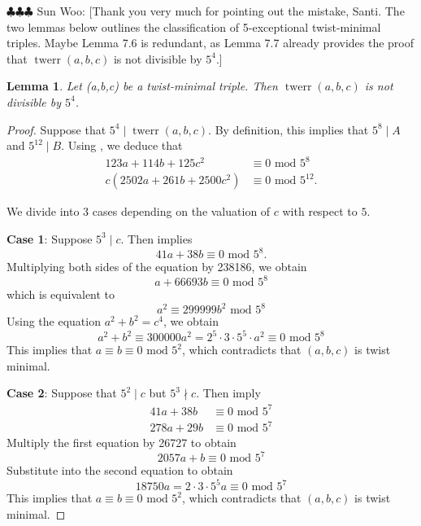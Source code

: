 \documentclass[12pt]{amsart}
\newcounter{counter}[section] %
\numberwithin{equation}{section} %
\newtheorem{lemma}[counter]{Lemma}
\theoremstyle{definition} \newtheorem{definition}[counter]{Definition}
\theoremstyle{remark} \newtheorem{nonexam}[counter]{Non-example}
\newcommand{\spark}[1]{{\color{olive} \sf
    $\clubsuit\clubsuit\clubsuit$ Sun Woo: [#1]}}
\DeclareMathOperator{\twerr}{twerr} %
\begin{document}
\spark{Thank you very much for pointing out the mistake, Santi. The two lemmas below outlines the classification of 5-exceptional twist-minimal triples. Maybe Lemma 7.6 is redundant, as Lemma 7.7 already provides the proof that $\twerr(a,b,c)$ is not divisible by $5^4$.}

\begin{lemma} \label{lemma:625-nmid-twerr}
    Let (a,b,c) be a twist-minimal triple. Then $\twerr(a,b,c)$ is not divisible by $5^4$.
\end{lemma}
\begin{proof}
    Suppose that $5^4 \mid \twerr(a,b,c)$. By definition, this implies that $5^8 \mid A$ and $5^{12} \mid B$. Using , we deduce that
    \begin{align*}
        123a + 114b + 125c^2 &\equiv 0 \text{ mod } 5^8 \\
        c(2502a + 261b + 2500c^2) &\equiv 0 \text{ mod } 5^{12}.
    \end{align*}

    We divide into 3 cases depending on the valuation of $c$ with respect to $5$.

\medskip

    \textbf{Case 1}: Suppose $5^3 \mid c$. Then  implies
    \begin{equation*}
        41 a + 38b \equiv 0 \text{ mod } 5^8.
    \end{equation*}
    Multiplying both sides of the equation by 238186, we obtain
    \begin{equation*}
        a + 66693b \equiv 0 \text{ mod } 5^8
    \end{equation*}
    which is equivalent to
    \begin{equation*}
        a^2 \equiv 299999 b^2 \text{ mod } 5^8 
    \end{equation*}
    Using the equation $a^2 + b^2 = c^4$, we obtain
    \begin{equation*}
        a^2 + b^2 \equiv 300000a^2 = 2^5 \cdot 3 \cdot 5^5 \cdot a^2 \equiv 0 \text{ mod } 5^8
    \end{equation*}
    This implies that $a \equiv b \equiv 0 \text{ mod } 5^2$, which contradicts that $(a,b,c)$ is twist minimal.

    \medskip 

    \textbf{Case 2}: Suppose that $5^2 \mid c$ but $5^3 \nmid c$. Then  imply
    \begin{align*}
        41a + 38b &\equiv 0 \text{ mod } 5^7 \\
        278a + 29b &\equiv 0 \text{ mod } 5^7
    \end{align*}
    Multiply the first equation by 26727 to obtain
    \begin{equation*}
        2057a + b \equiv 0 \text{ mod } 5^7
    \end{equation*}
    Substitute into the second equation to obtain
    \begin{equation*}
        18750a = 2 \cdot 3 \cdot 5^5 a \equiv 0 \text{ mod } 5^7
    \end{equation*}
    This implies that $a \equiv b \equiv 0 \text{ mod } 5^2$, which contradicts that $(a,b,c)$ is twist minimal.


\end{proof}
\end{document}
